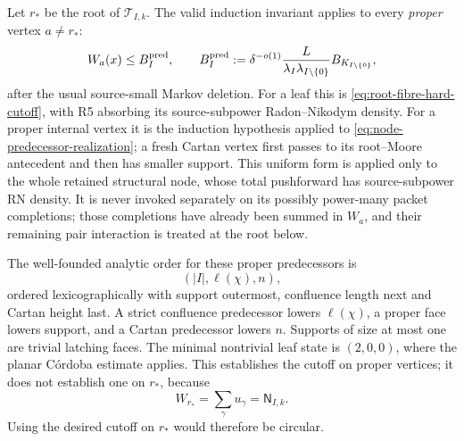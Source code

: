 \documentclass[11pt]{article}
\begin{document}
Let \(r_\ast\) be the root of \(\mathscr T_{I,k}\).  The valid induction
invariant applies to every \emph{proper} vertex \(a\ne r_\ast\):
\[
 W_a(x)\le B_I^{\rm pred},
 \qquad
 B_I^{\rm pred}
 :=
 \delta^{-o(1)}
 \frac{L}{\lambda_I\lambda_{I\setminus\{0\}}}
 B_{K_{I\setminus\{0\}}},
\]
after the usual source-small Markov deletion.  For a leaf this is
\eqref{eq:root-fibre-hard-cutoff}, with R5 absorbing its source-subpower
Radon--Nikodym density.  For a proper internal vertex it is the induction
hypothesis applied to \eqref{eq:node-predecessor-realization}; a fresh Cartan
vertex first passes to its root--Moore antecedent and then has smaller support.
This uniform form is applied only to the whole retained structural node, whose
total pushforward has source-subpower RN density.  It is never invoked
separately on its possibly power-many packet completions; those completions have
already been summed in \(W_a\), and their remaining pair interaction is treated
at the root below.

The well-founded analytic order for these proper predecessors is
\begin{equation}\label{eq:analytic-descent-order}
 (|I|,\ell(\chi),n),
\end{equation}
ordered lexicographically with support outermost, confluence length next and
Cartan height last.  A strict confluence predecessor lowers
\(\ell(\chi)\), a proper face lowers support, and a Cartan predecessor lowers
\(n\).  Supports of size at most one are trivial latching faces.  The minimal
nontrivial leaf state is \((2,0,0)\), where the planar C\'ordoba estimate
applies.  This establishes the cutoff on proper vertices; it does not establish
one on \(r_\ast\), because
\begin{equation}\label{eq:history-root-is-global-sum}
 W_{r_\ast}=\sum_\gamma u_\gamma=\mathsf N_{I,k}.
\end{equation}
Using the desired cutoff on \(r_\ast\) would therefore be circular.
\end{document}
